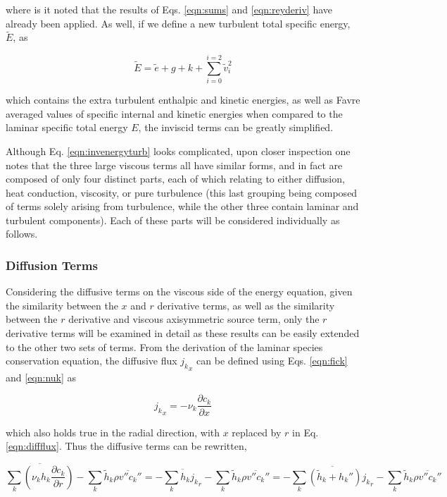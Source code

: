 	where is it noted that the results of Eqs. \ref{eqn:sums} and \ref{eqn:reyderiv} have already been applied.
As well, if we define a new turbulent total specific energy, $\tilde E$, as 

\begin{equation}
	\tilde E = \tilde e + g + k + \sum_{i=0}^{i=2}\tilde v_i^2
\label{eqn:spenergyturb}
\end{equation}

	which contains the extra turbulent enthalpic and kinetic energies, as well as Favre averaged values of
specific internal and kinetic energies when compared to the laminar specific total energy $E$, the inviscid terms 
can be greatly simplified.

	Although Eq. \ref{eqn:invenergyturb} looks complicated, upon closer inspection one notes that the
three large viscous terms all have similar forms, and in fact are composed of only four distinct parts, each
of which relating to either diffusion, heat conduction, viscosity, or pure turbulence (this last grouping 
being composed of terms solely arising from turbulence, while the other three contain laminar and turbulent
components).  Each of these parts will be considered individually as follows.

\subsubsection{Diffusion Terms}

	Considering the diffusive terms on the viscous side of the energy equation, given the similarity between the
$x$ and $r$ derivative terms, as well as the similarity between the $r$ derivative and viscous axisymmetric source term,
only the $r$ derivative terms will be examined in detail as these results can be easily extended to the other two
sets of terms.  From the derivation of the laminar species conservation equation, the diffusive flux ${j_k}_x$ 
can be defined using Eqs. \ref{eqn:fick} and \ref{eqn:nuk} as 

\begin{equation}
	{j_k}_x = -\nu_k \frac{\partial c_k}{\partial x}
\label{eqn:diffflux}
\end{equation}

	which also holds true in the radial direction, with $x$ replaced by $r$ in Eq. \ref{eqn:diffflux}.  Thus
the diffusive terms can be rewritten,

\begin{displaymath}
	\overline{\sum_k (\nu_k h_k\frac{\partial c_k}{\partial r})} - \sum_k \tilde h_k \overline{\rho v'' c_k''} = 
	-\overline{\sum_{k}h_k {j_k}_r} - \sum_k \tilde h_k \overline{\rho v'' c_k''} = 
	-\overline{\sum_{k}(\tilde h_k + h_k''){j_k}_r} - \sum_k \tilde h_k \overline{\rho v'' c_k''}
\end{displaymath}

